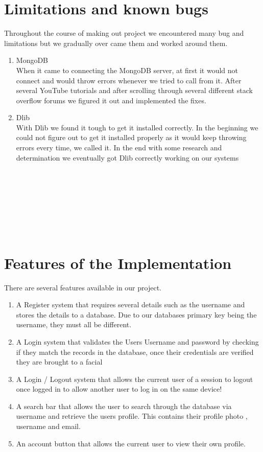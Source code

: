 \documentclass{article}
\begin{document}
\section{Limitations and known bugs}
Throughout the course of making out project we encountered many bug and limitations but we gradually over came them and worked around them.
\begin{enumerate}
\item MongoDB \\
When it came to connecting the MongoDB server, at first it would not connect and would throw errors whenever we tried to call from it. After several YouTube tutorials and after scrolling through several different stack overflow forums we figured it out and implemented the fixes. 
\item Dlib \\
With Dlib we found it tough to get it installed correctly. In the beginning we could not figure out to get it installed properly as it would keep throwing errors every time, we called it. In the end with some research and determination we eventually got Dlib correctly working on our systems
\\
\\
\\
\\
\\
\\
\\
\\

\end{enumerate}

\newpage

\section{Features of the Implementation}

There are several features available in our project.
\begin{enumerate}
    \item A Register system that requires several details such as the username and stores the details to a database.
    Due to our databases primary key being the username, they must all be different.
    \item A Login system that validates the Users Username and password by checking if they match the records in the database, once their credentials are verified they are brought to a facial 
    \item A Login / Logout system that allows the current user of a session to logout once logged in to allow another user to log in on the same device!
    \item A search bar that allows the user to search through the database  via username and retrieve the users profile.
    This contains their profile photo , username and email.
    \item An account button that allows the current user to view their own profile.

\end{enumerate}
\end{document}
